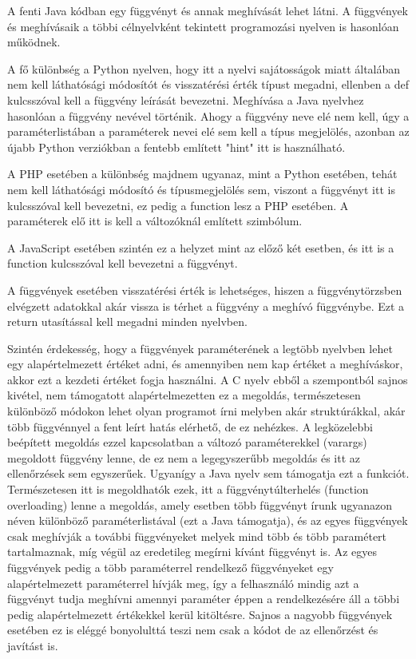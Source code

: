 A fenti Java kódban egy függvényt és annak meghívását lehet látni. A függvények és meghívásaik a többi célnyelvként tekintett programozási nyelven is hasonlóan működnek.

A fő különbség a Python nyelven, hogy itt a nyelvi sajátosságok miatt általában nem kell láthatósági módosítót és visszatérési érték típust megadni, ellenben a def kulcsszóval kell a függvény leírását bevezetni. Meghívása a Java nyelvhez hasonlóan a függvény nevével történik. Ahogy a függvény neve elé nem kell, úgy a paraméterlistában a paraméterek nevei elé sem kell a típus megjelölés, azonban az újabb Python verziókban a fentebb említett "hint" itt is használható.

A PHP esetében a különbség majdnem ugyanaz, mint a Python esetében, tehát nem kell láthatósági módosító és típusmegjelölés sem, viszont a függvényt itt is kulcsszóval kell bevezetni, ez pedig a function lesz a PHP esetében. A paraméterek elő itt is kell a változóknál említett \textdollar szimbólum.

A JavaScript esetében szintén ez a helyzet mint az előző két esetben, és itt is a function kulcsszóval kell bevezetni a függvényt.

A függvények esetében visszatérési érték is lehetséges, hiszen a függvénytörzsben elvégzett adatokkal akár vissza is térhet a függvény a meghívó függvénybe. Ezt a return utasítással kell megadni minden nyelvben.

Szintén érdekesség, hogy a függvények paraméterének a legtöbb nyelvben lehet egy alapértelmezett értéket adni, és amennyiben nem kap értéket a meghíváskor, akkor ezt a kezdeti értéket fogja használni.
A C nyelv ebből a szempontból sajnos kivétel, nem támogatott alapértelmezetten ez a megoldás, természetesen különböző módokon lehet olyan programot írni melyben akár struktúrákkal, akár több függvénnyel a fent leírt hatás elérhető, de ez nehézkes. A legközelebbi beépített megoldás ezzel kapcsolatban a változó paraméterekkel (varargs) megoldott függvény lenne, de ez nem a legegyszerűbb megoldás és itt az ellenőrzések sem egyszerűek.
Ugyanígy a Java nyelv sem támogatja ezt a funkciót. Természetesen itt is megoldhatók ezek, itt a függvénytúlterhelés (function overloading) lenne a megoldás, amely esetben több függvényt írunk ugyanazon néven különböző paraméterlistával (ezt a Java támogatja), és az egyes függvények csak meghívják a további függvényeket melyek mind több és több paramétert tartalmaznak, míg végül az eredetileg megírni kívánt függvényt is. Az egyes függvények pedig a több paraméterrel rendelkező függvényeket egy alapértelmezett paraméterrel hívják meg, így a felhasználó mindig azt a függvényt tudja meghívni amennyi paraméter éppen a rendelkezésére áll a többi pedig alapértelmezett értékekkel kerül kitöltésre. Sajnos a nagyobb függvények esetében ez is eléggé bonyolulttá teszi nem csak a kódot de az ellenőrzést és javítást is.

